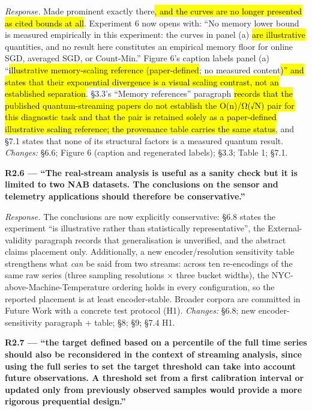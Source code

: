 \documentclass[
  11pt,
]{article}
\providecommand{\DIFadd}[1]{\hl{#1}} %
\providecommand{\DIFdel}[1]{} %
\providecommand{\DIFaddbegin}{} %
\providecommand{\DIFaddend}{} %
\providecommand{\DIFdelbegin}{} %
\providecommand{\DIFdelend}{} %
\providecommand{\DIFaddbegin}{}
\begin{document}
\emph{Response.} Made prominent exactly there\DIFaddbegin \DIFadd{, and the curves are no
longer presented as cited bounds at all}\DIFaddend . Experiment 6 now opens with:
``No memory lower bound is measured empirically in this experiment: the
curves in panel (a) \DIFdelbegin \DIFdel{plot cited theoretical }\DIFdelend \DIFaddbegin \DIFadd{are illustrative }\DIFaddend quantities, and no result here
constitutes an empirical memory floor for online SGD, averaged SGD, or
Count-Min.'' Figure 6's caption labels panel (a) ``\DIFdelbegin \DIFdel{cited bounds}\DIFdelend \DIFaddbegin \DIFadd{illustrative
memory-scaling reference (paper-defined}\DIFaddend ; no measured content\DIFdelbegin \DIFdel{'' and the in-image curve labels now
read ``(cited theory)'' }\DIFdelend \DIFaddbegin \DIFadd{)'' and
states that their exponential divergence is a visual scaling contrast,
not an established separation}\DIFaddend . §3.3's ``Memory references'' paragraph
\DIFdelbegin \DIFdel{and the
provenance table carry the same statement structurally}\DIFdelend \DIFaddbegin \DIFadd{records that the published quantum-streaming papers do not establish the
O(n)/Ω(√N) pair for this diagnostic task and that the pair is retained
solely as a paper-defined illustrative scaling reference; the provenance
table carries the same status}\DIFaddend , and §7.1 states that none of its
structural factors is a measured quantum result. \emph{Changes:} §6.6;
Figure 6 (caption and regenerated labels); §3.3; Table 1; §7.1.

\textbf{R2.6 --- ``The real-stream analysis is useful as a sanity check
but it is limited to two NAB datasets. The conclusions on the sensor and
telemetry applications should therefore be conservative.''}

\emph{Response.} The conclusions are now explicitly conservative: §6.8
states the experiment ``is illustrative rather than statistically
representative'', the External-validity paragraph records that
generalisation is unverified, and the abstract claims placement only.
Additionally, a new encoder/resolution sensitivity table strengthens
what \emph{can} be said from two streams: across ten re-encodings of the
same raw series (three sampling resolutions × three bucket widths), the
NYC-above-Machine-Temperature ordering holds in every configuration, so
the reported placement is at least encoder-stable. Broader corpora are
committed in Future Work with a concrete test protocol (H1).
\emph{Changes:} §6.8; new encoder-sensitivity paragraph + table; §8; §9;
§7.4 H1.

\textbf{R2.7 --- ``the target defined based on a percentile of the full
time series should also be reconsidered in the context of streaming
analysis, since using the full series to set the target threshold can
take into account future observations. A threshold set from a first
calibration interval or updated only from previously observed samples
would provide a more rigorous prequential design.''}
\end{document}
